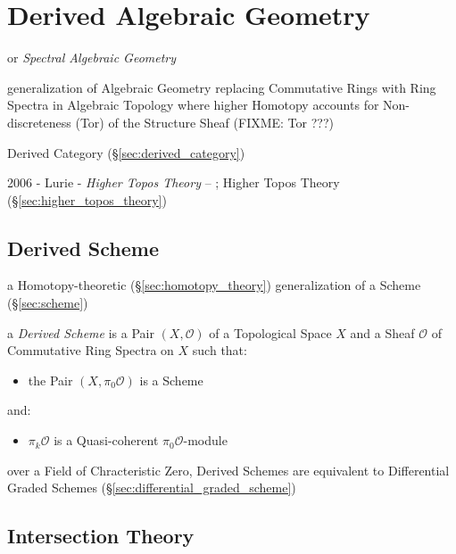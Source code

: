 \section{Derived Algebraic Geometry}\label{sec:derived_algebraic_geometry}

or \emph{Spectral Algebraic Geometry}

generalization of Algebraic Geometry replacing Commutative Rings with Ring
Spectra in Algebraic Topology where higher Homotopy accounts for
Non-discreteness (Tor) of the Structure Sheaf
(FIXME: Tor ???)

Derived Category (\S\ref{sec:derived_category})

2006 - Lurie - \emph{Higher Topos Theory}
-- ; \fist Higher Topos Theory (\S\ref{sec:higher_topos_theory})



\subsection{Derived Scheme}\label{sec:derived_scheme}

a Homotopy-theoretic (\S\ref{sec:homotopy_theory}) generalization of a Scheme
(\S\ref{sec:scheme})

a \emph{Derived Scheme} is a Pair $(X, \mathcal{O})$ of a Topological Space $X$
and a Sheaf $\mathcal{O}$ of Commutative Ring Spectra on $X$ such that:
\begin{itemize}
\item the Pair $(X, \pi_0\mathcal{O})$ is a Scheme
\end{itemize}
and:
\begin{itemize}
\item $\pi_k\mathcal{O}$ is a Quasi-coherent $\pi_0\mathcal{O}$-module
\end{itemize}

over a Field of Chracteristic Zero, Derived Schemes are equivalent to
Differential Graded Schemes (\S\ref{sec:differential_graded_scheme})



\subsection{Intersection Theory}\label{sec:intersection_theory}

